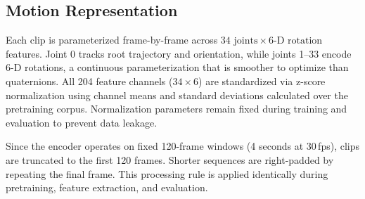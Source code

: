 \documentclass[letterpaper]{article} %
\begin{document}





\subsection{Motion Representation}
\label{sec:motionrep}
 Each clip is parameterized frame-by-frame across $34\text{ joints} \times \text{6-D rotation}$
features. Joint 0 tracks root trajectory and orientation, while joints 1--33 encode 6-D rotations, a
continuous parameterization that is smoother to optimize than quaternions.
All 204 feature channels ($34 \times 6$) are standardized via z-score normalization using
channel means and standard deviations calculated over the pretraining corpus. Normalization parameters remain fixed during training and evaluation to prevent data
leakage.

Since the encoder operates on fixed 120-frame windows (4 seconds at 30\,fps), clips are truncated to the first 120 frames. Shorter sequences are right-padded by repeating the final
frame. This processing rule is applied identically during pretraining, feature extraction, and
evaluation.
\end{document}
